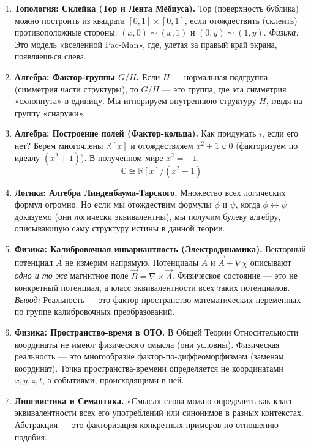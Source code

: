 \documentclass[11pt, a4paper]{extarticle}
\newcommand{\R}{{\mathbb R}}
\newcommand{\C}{{\mathbb C}}
\begin{document}
\begin{enumerate}
    \item \textbf{Топология: Склейка (Тор и Лента Мёбиуса).}
    Тор (поверхность бублика) можно построить из квадрата $[0,1] \times [0,1]$, если отождествить (склеить) противоположные стороны: $(x, 0) \sim (x, 1)$ и $(0, y) \sim (1, y)$.
    \textit{Физика:} Это модель «вселенной Pac-Man», где, улетая за правый край экрана, появляешься слева.
    
    \item \textbf{Алгебра: Фактор-группы $G/H$.}
    Если $H$ — нормальная подгруппа (симметрия части структуры), то $G/H$ — это группа, где эта симметрия «схлопнута» в единицу. Мы игнорируем внутреннюю структуру $H$, глядя на группу «снаружи».
    
    \item \textbf{Алгебра: Построение полей (Фактор-кольца).}
    Как придумать $i$, если его нет? Берем многочлены $\R[x]$ и отождествляем $x^2+1$ с $0$ (факторизуем по идеалу $(x^2+1)$). В полученном мире $x^2 = -1$.
    $$\C \cong \R[x] / (x^2 + 1)$$
    
    \item \textbf{Логика: Алгебра Линденбаума-Тарского.}
    Множество всех логических формул огромно. Но если мы отождествим формулы $\phi$ и $\psi$, когда $\phi \leftrightarrow \psi$ доказуемо (они логически эквивалентны), мы получим булеву алгебру, описывающую саму структуру истины в данной теории.
    
    \item \textbf{Физика: Калибровочная инвариантность (Электродинамика).}
    Векторный потенциал $\vec{A}$ не измерим напрямую. Потенциалы $\vec{A}$ и $\vec{A} + \nabla \chi$ описывают \textit{одно и то же} магнитное поле $\vec{B} = \nabla \times \vec{A}$.
    Физическое состояние — это не конкретный потенциал, а класс эквивалентности всех таких потенциалов.
    \textit{Вывод:} Реальность — это фактор-пространство математических переменных по группе калибровочных преобразований.
    
    \item \textbf{Физика: Пространство-время в ОТО.}
    В Общей Теории Относительности координаты не имеют физического смысла (они условны). Физическая реальность — это многообразие фактор-по-диффеоморфизмам (заменам координат). Точка пространства-времени определяется не координатами $x,y,z,t$, а событиями, происходящими в ней.
    
    \item \textbf{Лингвистика и Семантика.}
    «Смысл» слова можно определить как класс эквивалентности всех его употреблений или синонимов в разных контекстах. Абстракция — это факторизация конкретных примеров по отношению подобия.
\end{enumerate}
\end{document}
